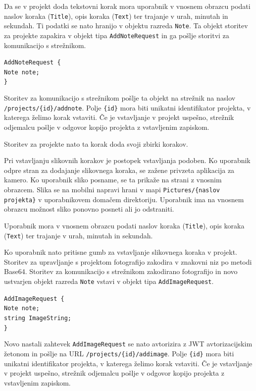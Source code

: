 \documentclass[a4paper, 12pt]{book}
\begin{document}
Da se v projekt doda tekstovni korak mora uporabnik v vnosnem obrazcu podati naslov koraka (\texttt{Title}), opis koraka (\texttt{Text}) ter trajanje v urah, minutah in sekundah.
Ti podatki se nato hranijo v objektu razreda \texttt{Note}.
Ta objekt storitev za projekte zapakira v objekt tipa \texttt{AddNoteRequest} in ga pošlje storitvi za komunikacijo s strežnikom.

\noindent \texttt{AddNoteRequest \{ \\
Note note; \\
\} }

Storitev za komunikacijo s strežnikom pošlje ta objekt na strežnik na naslov \texttt{/projects/\{id\}/addnote}.
Polje \texttt{\{id\}} mora biti unikatni identifikator projekta, v katerega želimo korak vstaviti.
Če je vstavljanje v projekt uspešno, strežnik odjemalcu pošlje v odgovor kopijo projekta z vstavljenim zapiskom.

Storitev za projekte nato ta korak doda svoji zbirki korakov.

Pri vstavljanju slikovnih korakov je postopek vstavljanja podoben.
Ko uporabnik odpre stran za dodajanje slikovnega koraka, se zažene privzeta aplikacija za kamero.
Ko uporabnik sliko posname, se ta prikaže na strani z vnosnim obrazcem.
Slika se na mobilni napravi hrani v mapi \texttt{Pictures/\{naslov projekta\}} v uporabnikovem domačem direktoriju.
Uporabnik ima na vnosnem obrazcu možnost sliko ponovno posneti ali jo odstraniti.

Uporabnik mora v vnosnem obrazcu podati naslov koraka (\texttt{Title}), opis koraka (\texttt{Text}) ter trajanje v urah, minutah in sekundah.

Ko uporabnik nato pritisne gumb za vstavljanje slikovnega koraka v projekt.
Storitev za upravljanje s projektom fotografijo zakodira v znakovni niz po metodi Base64.
Storitev za komunikacijo s strežnikom zakodirano fotografijo in novo ustvarjen objekt razreda \texttt{Note} vstavi v objekt tipa \texttt{AddImageRequest}.

\noindent \texttt{AddImageRequest \{ \\
Note note; \\
string ImageString;  \\
\} }

Novo nastali zahtevek \texttt{AddImageRequest} se nato avtorizira z JWT avtorizacijskim žetonom in pošlje na URL \texttt{/projects/\{id\}/addimage}.
Polje \texttt{\{id\}} mora biti unikatni identifikator projekta, v katerega želimo korak vstaviti.
Če je vstavljanje v projekt uspešno, strežnik odjemalcu pošlje v odgovor kopijo projekta z vstavljenim zapiskom.
\end{document}

